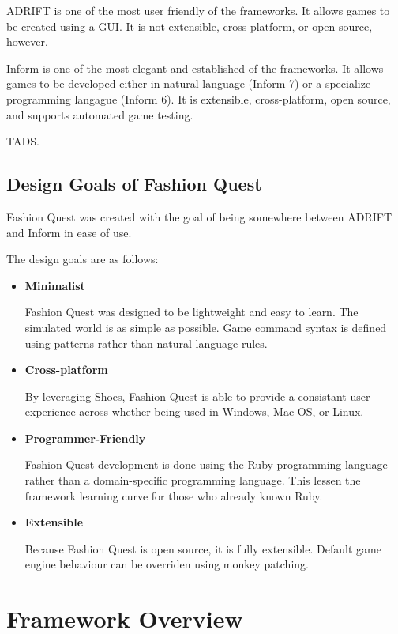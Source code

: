 \documentclass[letterpaper,10pt,english]{manual}
\begin{document}
ADRIFT is one of the most user friendly of the frameworks. It allows games to be created using a GUI. It is not extensible, cross-platform, or open source, however.

Inform is one of the most elegant and established of the frameworks. It allows games to be developed either in natural language (Inform 7) or a specialize programming langague (Inform 6). It is extensible, cross-platform, open source, and supports automated game testing.

TADS.


\section{Design Goals of Fashion Quest}

Fashion Quest was created with the goal of being somewhere between ADRIFT and Inform in ease of use.

The design goals are as follows:
\begin{itemize}
\item {} 
\textbf{Minimalist}

Fashion Quest was designed to be lightweight and easy to learn. The simulated world is as simple as possible. Game command syntax is defined using patterns rather than natural language rules.

\item {} 
\textbf{Cross-platform}

By leveraging Shoes, Fashion Quest is able to provide a consistant user experience across whether being used in Windows, Mac OS, or Linux.

\item {} 
\textbf{Programmer-Friendly}

Fashion Quest development is done using the Ruby programming language rather than a domain-specific programming language. This lessen the framework learning curve for those who already known Ruby.

\item {} 
\textbf{Extensible}

Because Fashion Quest is open source, it is fully extensible. Default game engine behaviour can be overriden using monkey patching.

\end{itemize}

\resetcurrentobjects
\hypertarget{--doc-overview}{}

\chapter{Framework Overview}
\end{document}
